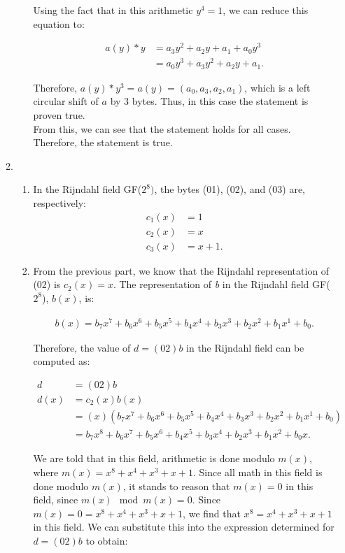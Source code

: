 \documentclass[11pt]{article}
\theoremstyle{definition}
\begin{document}
\begin{enumerate}
\begin{enumerate}
\begin{enumerate}
Using the fact that in this arithmetic $y^4 = 1$, we can reduce this equation to:

\begin{align*}
    a(y) * y &= a_3y^2 + a_2y + a_1 + a_0y^3 \\
    &= a_0y^3 + a_3y^2 + a_2y + a_1.
\end{align*}

Therefore, $a(y) * y^3 = a(y) = (a_0, a_3, a_2, a_1)$, which is a left  circular shift of $a$ by 3 bytes. Thus, in this case the statement is proven true.
\\

From this, we can see that the statement holds for all cases. Therefore, the statement is true. 

\end{enumerate}

\item \begin{enumerate}
\item In the Rijndahl field GF($2^8)$, the bytes (01), (02), and (03) are, respectively:
\begin{align*}
    c_1(x) &= 1\\
    c_2(x) &= x\\
    c_3(x) &= x+1.
\end{align*} 


\item From the previous part, we know that the Rijndahl representation of (02) is $c_2(x) = x$. The representation of \textit{b} in the Rijndahl field GF($2^8$), $b(x)$, is:

\begin{align*}
    b(x) = b_7x^7 + b_6x^6 + b_5x^5 + b_4x^4 + b_3x^3 + b_2x^2 + b_1x^1 + b_0.
\end{align*}

Therefore, the value of $d = (02)b$ in the Rijndahl field can be computed as:

\begin{align*}
    d &= (02)b \\
    d(x) &= c_2(x)b(x) \\
    &= (x)(b_7x^7 + b_6x^6 + b_5x^5 + b_4x^4 + b_3x^3 + b_2x^2 + b_1x^1 + b_0) \\
    &= b_7x^8 + b_6x^7 + b_5x^6 + b_4x^5 + b_3x^4 + b_2x^3 + b_1x^2 + b_0x.
\end{align*}

We are told that in this field, arithmetic is done modulo $m(x)$, where $m(x) = x^8 + x^4 + x^3 + x + 1$. Since all math in this field is done modulo $m(x)$, it stands to reason that $m(x) = 0$ in this field, since $m(x) \mod{m(x)} = 0$. Since $m(x) = 0 = x^8 + x^4 + x^3 + x + 1$, we find that $x^8 = x^4 + x^3 + x + 1$ in this field. We can substitute this into the expression determined for $d = (02)b$ to obtain:


\end{enumerate}
\end{enumerate}
\end{enumerate}
\end{document}
